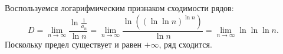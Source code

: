\documentclass{article}
\begin{document}
Воспользуемся логарифмическим признаком сходимости рядов:
$$D = \lim_{n\to \infty} \frac{\ln \frac{1}{a_n}}{\ln n} = \lim_{n\to \infty} \frac{\ln ((\ln \ln n)^{\ln n})}{\ln n} = \lim_{n\to \infty} \ln \ln \ln n.$$
Поскольку предел существует и равен $+ \infty$, ряд сходится.
\end{document}
